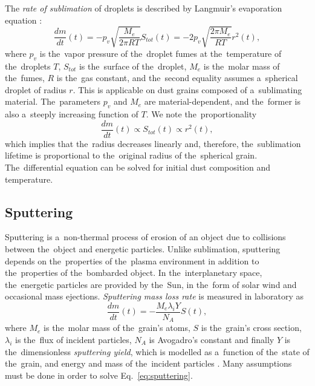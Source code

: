 The \textit{rate of sublimation} of droplets is described by Langmuir's evaporation equation \citep{langmuir1918evaporation}:
\begin{equation}
    \frac{dm}{dt}(t) = -p_{v} \sqrt{\frac{M_e}{2\pi RT}} S_{tot}(t) =  -2 p_{v}  \sqrt{\frac{2 \pi M_e}{RT}} r^2(t) ,
\end{equation}
where $p_v$ is the~vapor pressure of the~droplet fumes at the~temperature of the~droplets $T$, $S_{tot}$ is the~surface of the~droplet, $M_e$ is the~molar mass of the~fumes, $R$ is the~gas constant, and the~second equality assumes a~spherical droplet of radius $r$. This is applicable on dust grains composed of a~sublimating material. The~parameters $p_v$ and $M_e$ are material-dependent, and the~former is also a~steeply increasing function of $T$. We note the~proportionality
\begin{equation}
    \frac{dm}{dt}(t) \propto S_{tot}(t) \propto r^2(t),
\end{equation}
which implies that the~radius decreases linearly and, therefore, the~sublimation lifetime is proportional to the~original radius of the~spherical grain. The~differential equation can be solved for initial dust composition and temperature.   

\subsection{Sputtering}

Sputtering is a~non-thermal process of erosion of an object due to collisions between the~object and energetic particles. Unlike sublimation, sputtering depends on the~properties of the~plasma environment in addition to the~properties of the~bombarded object. In the~interplanetary space, the~energetic particles are provided by the~Sun, in the~form of solar wind and occasional mass ejections. \textit{Sputtering mass loss rate} is measured in laboratory as
\begin{equation}
    \frac{dm}{dt}(t) = - \frac{ M_e \lambda_i Y }{N_A} S(t), 
    \label{eq:sputtering}
\end{equation}
where $M_e$ is the~molar mass of the~grain's atoms, $S$ is the~grain's cross section, $\lambda_i$ is the~flux of incident particles, $N_A$ is Avogadro's constant and finally $Y$ is the~dimensionless \textit{sputtering yield}, which is modelled as a~function of the~state of the~grain, and energy and mass of the~incident particles \citep{vyvsinka2018odpravsovani}. Many assumptions must be done in order to solve Eq.~\ref{eq:sputtering}. 

